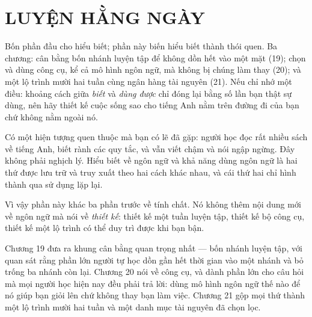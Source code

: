 \documentclass[../english.tex]{subfiles}
\begin{document}
\part{LUYỆN HẰNG NGÀY}
\begin{tomtat}
Bốn phần đầu cho hiểu biết; phần này biến hiểu biết thành thói quen. Ba chương: cân bằng bốn nhánh luyện tập để không dồn hết vào một mặt (19); chọn và dùng công cụ, kể cả mô hình ngôn ngữ, mà không bị chúng làm thay (20); và một lộ trình mười hai tuần cùng ngân hàng tài nguyên (21). Nếu chỉ nhớ một điều: khoảng cách giữa \emph{biết} và \emph{dùng được} chỉ đóng lại bằng số lần bạn thật sự dùng, nên hãy thiết kế cuộc sống sao cho tiếng Anh nằm trên đường đi của bạn chứ không nằm ngoài nó.
\end{tomtat}

Có một hiện tượng quen thuộc mà bạn có lẽ đã gặp: người học đọc rất nhiều sách về tiếng Anh, biết rành các quy tắc, và vẫn viết chậm và nói ngập ngừng. Đây không phải nghịch lý. Hiểu biết về ngôn ngữ và khả năng dùng ngôn ngữ là hai thứ được lưu trữ và truy xuất theo hai cách khác nhau, và cái thứ hai chỉ hình thành qua sử dụng lặp lại.

Vì vậy phần này khác ba phần trước về tính chất. Nó không thêm nội dung mới về ngôn ngữ mà nói về \emph{thiết kế}: thiết kế một tuần luyện tập, thiết kế bộ công cụ, thiết kế một lộ trình có thể duy trì được khi bạn bận.

Chương 19 đưa ra khung cân bằng quan trọng nhất --- bốn nhánh luyện tập, với quan sát rằng phần lớn người tự học dồn gần hết thời gian vào một nhánh và bỏ trống ba nhánh còn lại. Chương 20 nói về công cụ, và dành phần lớn cho câu hỏi mà mọi người học hiện nay đều phải trả lời: dùng mô hình ngôn ngữ thế nào để nó giúp bạn giỏi lên chứ không thay bạn làm việc. Chương 21 gộp mọi thứ thành một lộ trình mười hai tuần và một danh mục tài nguyên đã chọn lọc.




\ifSubfilesClassLoaded{\printbibliography[title={Nguồn}]}{}
\end{document}
